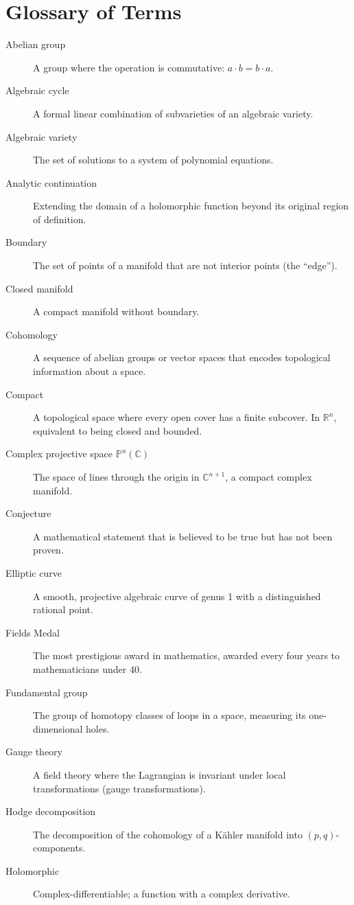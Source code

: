 \chapter{Glossary of Terms}
\label{app:glossary}

\begin{description}
  \item[Abelian group] A group where the operation is commutative: $a \cdot b = b \cdot a$.
  \item[Algebraic cycle] A formal linear combination of subvarieties of an algebraic variety.
  \item[Algebraic variety] The set of solutions to a system of polynomial equations.
  \item[Analytic continuation] Extending the domain of a holomorphic function beyond its original region of definition.
  \item[Boundary] The set of points of a manifold that are not interior points (the ``edge'').
  \item[Closed manifold] A compact manifold without boundary.
  \item[Cohomology] A sequence of abelian groups or vector spaces that encodes topological information about a space.
  \item[Compact] A topological space where every open cover has a finite subcover. In $\mathbb{R}^n$, equivalent to being closed and bounded.
  \item[Complex projective space $\mathbb{P}^n(\mathbb{C})$] The space of lines through the origin in $\mathbb{C}^{n+1}$, a compact complex manifold.
  \item[Conjecture] A mathematical statement that is believed to be true but has not been proven.
  \item[Elliptic curve] A smooth, projective algebraic curve of genus 1 with a distinguished rational point.
  \item[Fields Medal] The most prestigious award in mathematics, awarded every four years to mathematicians under 40.
  \item[Fundamental group] The group of homotopy classes of loops in a space, measuring its one-dimensional holes.
  \item[Gauge theory] A field theory where the Lagrangian is invariant under local transformations (gauge transformations).
  \item[Hodge decomposition] The decomposition of the cohomology of a K\"{a}hler manifold into $(p, q)$-components.
  \item[Holomorphic] Complex-differentiable; a function with a complex derivative.

\end{description}
